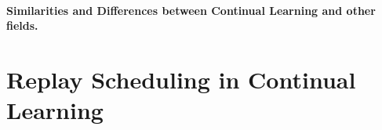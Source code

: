 




\paragraph{Similarities and Differences between Continual Learning and other fields.} 

\section{Replay Scheduling in Continual Learning} 

